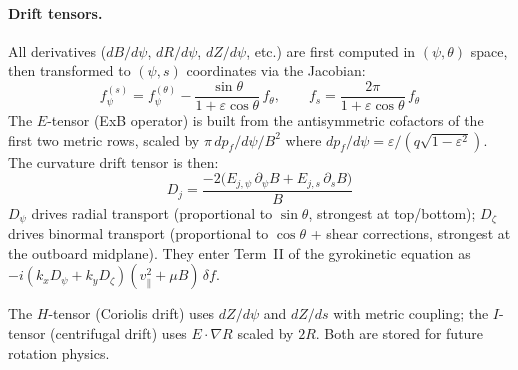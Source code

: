 \documentclass{article}
\theoremstyle{plain}
\theoremstyle{definition}
\theoremstyle{remark}
\begin{document}
\paragraph{Drift tensors.}
All derivatives ($dB/d\psi$, $dR/d\psi$, $dZ/d\psi$, etc.) are first computed in $(\psi, \theta)$ space, then transformed to $(\psi, s)$ coordinates via the Jacobian:
\begin{equation}
f^{(s)}_\psi = f^{(\theta)}_\psi - \frac{\sin\theta}{1+\varepsilon\cos\theta}\, f_\theta, \qquad
f_s = \frac{2\pi}{1+\varepsilon\cos\theta}\, f_\theta
\end{equation}
The $E$-tensor (ExB operator) is built from the antisymmetric cofactors of the first two metric rows, scaled by $\pi\, dp_f/d\psi / B^2$ where $dp_f/d\psi = \varepsilon/(q\sqrt{1-\varepsilon^2})$. The curvature drift tensor is then:
\begin{equation}
D_j = \frac{-2\bigl(E_{j,\psi}\,\partial_\psi B + E_{j,s}\,\partial_s B\bigr)}{B}
\end{equation}
$D_\psi$ drives radial transport (proportional to $\sin\theta$, strongest at top/bottom); $D_\zeta$ drives binormal transport (proportional to $\cos\theta$ + shear corrections, strongest at the outboard midplane). They enter Term~II of the gyrokinetic equation as $-i(k_x D_\psi + k_y D_\zeta)(v_\parallel^2 + \mu B)\,\delta f$.

The $H$-tensor (Coriolis drift) uses $dZ/d\psi$ and $dZ/ds$ with metric coupling; the $I$-tensor (centrifugal drift) uses $E \cdot \nabla R$ scaled by $2R$. Both are stored for future rotation physics.
\end{document}
